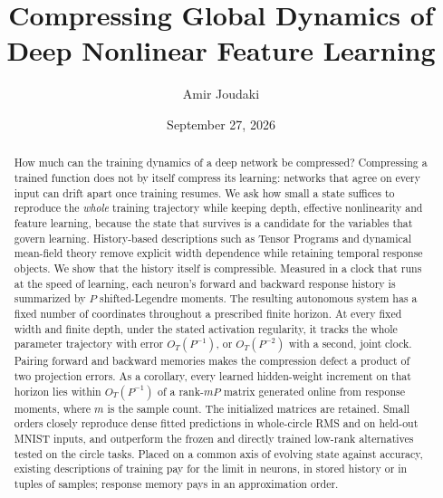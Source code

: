 \documentclass[11pt]{article}
\title{{\fontsize{14}{17}\selectfont\bfseries
Compressing Global Dynamics of Deep Nonlinear Feature Learning}}
\author{Amir Joudaki}
\date{September 27, 2026}
\theoremstyle{definition}
\theoremstyle{remark}
\begin{document}
\maketitle

\begin{abstract}
How much can the training dynamics of a deep network be compressed?  Compressing
a trained function does not by itself compress its learning: networks that
agree on every input can drift apart once training resumes.  We ask how
small a state suffices to reproduce the \emph{whole} training trajectory while
keeping depth, effective nonlinearity and feature learning, because the state
that survives is a candidate for the variables that govern learning.
History-based descriptions such as Tensor Programs and dynamical mean-field
theory remove explicit width dependence while retaining temporal response objects.
We show that the history itself is compressible.  Measured in a clock that runs
at the speed of learning, each neuron's forward and backward response history is
summarized by $P$ shifted-Legendre moments.  The resulting autonomous system has
a fixed number of coordinates throughout a prescribed finite horizon.  At
every fixed width and finite depth, under the stated activation regularity,
it tracks the whole parameter trajectory with error $O_T(P^{-1})$, or
$O_T(P^{-2})$ with a second, joint clock.  Pairing forward and backward
memories makes the compression defect a product of two projection errors.
As a corollary, every learned hidden-weight increment on that horizon lies
within $O_T(P^{-1})$ of a rank-$mP$ matrix generated online from response moments,
where $m$ is the sample count.  The initialized matrices are retained.
Small orders closely reproduce dense fitted predictions in whole-circle RMS
and on held-out MNIST inputs, and outperform the frozen and directly trained
low-rank alternatives tested on the circle tasks.  Placed on a common axis of evolving state
against accuracy, existing descriptions of training pay for the limit in
neurons, in stored history or in tuples of samples; response memory pays in an
approximation order.
\end{abstract}
\end{document}

